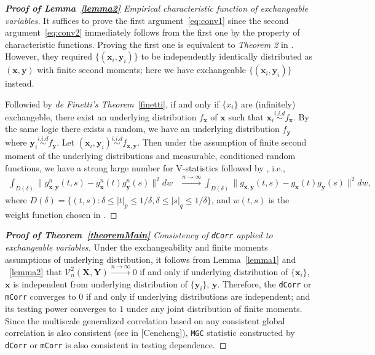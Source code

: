 \documentclass[12pt]{article}
\theoremstyle{definition}
\begin{document}
\begin{proof}[\textbf{Proof of Lemma~\ref{lemma2}} Empirical characteristic function of exchangeable variables] 
\bigskip	
It suffices to prove the first argument~\ref{eq:conv1} since the second argument~\ref{eq:conv2} immediately follows from the first one by the property of characteristic functions.
Proving the first one is equivalent to \textit{Theorem 2} in \cite{szekely2007measuring}. However, they required $\{(\mathbf{x}_{i},\mathbf{y}_{i})\}$ to be independently identically distributed as $(\mathbf{x},\mathbf{y})$ with finite second moments; here we have exchangeable $\{ ( \mathbf{x}_{i}, \mathbf{y}_{i}  ) \}$ instead. 


Followied by \textit{de Finetti's Theorem}~\ref{finetti}, if and only if $\{ x_{i} \}$ are (infinitely) exchangeble, there exist an underlying distribution $f_{\mathbf{x}}$ of $\mathbf{x}$ such that $\mathbf{x}_{i}  \overset{i.i.d}{\sim} f_{\mathbf{x}} $. By the same logic there exists a random, we have an underlying distribution $f_{\mathbf{y}}$ where $\mathbf{y}_{i} \overset{i.i.d}{\sim} f_{\mathbf{y}}$. Let $(\mathbf{x}_{i}, \mathbf{y}_{i}) \overset{i.i.d}{\sim}   f_{\mathbf{x}, \mathbf{y}}$. Then under the assumption of finite second moment of the underlying distributions and measurable, conditioned random functions, we have a strong large number for V-statistics followed by \cite{szekely2007measuring}, i.e., 
\begin{eqnarray}
		\displaystyle\int_{D(\delta)}{\|g_{\mathbf{x},\mathbf{y}}^{n}(t,s)-g_{\mathbf{x}}^{n}(t)g_{\mathbf{y}}^{n}(s)\|^{2}}dw &\stackrel{n \rightarrow \infty}{\longrightarrow} 
		 \displaystyle\int_{D(\delta)}{\|g_{\mathbf{x},\mathbf{y}}(t,s)-g_{\mathbf{x}}(t)g_{\mathbf{y}}(s)\|^{2}}dw,
\label{eq:SLLN}
\end{eqnarray}
where $D(\delta)=\{(t,s):\delta \leq |t|_{p} \leq 1/\delta,\delta \leq |s|_{q} \leq 1/\delta\}$, and $w(t,s)$ is the weight function chosen in \cite{szekely2007measuring}. 
\end{proof}

\begin{proof}[\textbf{Proof of Theorem~\ref{theoremMain}} Consistency of \texttt{dCorr} applied to exchangeable variables]
\bigskip
Under the exchangeability and finite moments assumptions of underlying distribution, it follows from Lemma~\ref{lemma1} and ~\ref{lemma2} that $\mathcal{V}^{2}_{n}(\mathbf{X},\mathbf{Y}) \xrightarrow{n \rightarrow \infty}  0$ if and only if underlying distribution of $\{\mathbf{x}_{i} \}$, $\mathbf{x}$ is independent from underlying distribution of $\{ \mathbf{y}_{i}  \}$, $\mathbf{y}$. Therefore, the \texttt{dCorr} or \texttt{mCorr} converges to $0$ if and only if  underlying distributions are independent; and its testing power converges to $1$ under any joint distribution of finite moments. Since the multiscale generalized correlation based on any consistent global correlation is also consistent (see in [Cencheng]), \texttt{MGC} statistic constructed by \texttt{dCorr} or \texttt{mCorr} is also consistent in testing dependence.
\end{proof}
\end{document}
